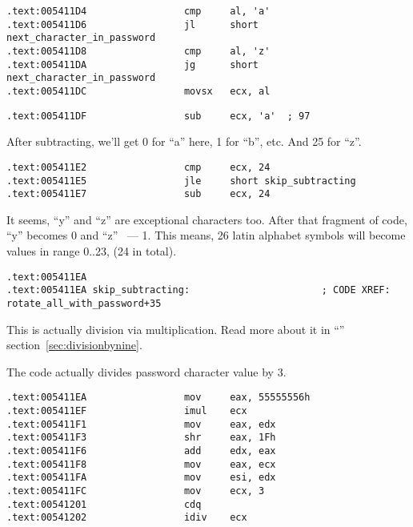 \begin{lstlisting}
.text:005411D4                 cmp     al, 'a'
.text:005411D6                 jl      short next_character_in_password
.text:005411D8                 cmp     al, 'z'
.text:005411DA                 jg      short next_character_in_password
.text:005411DC                 movsx   ecx, al
\end{lstlisting}


\begin{lstlisting}
.text:005411DF                 sub     ecx, 'a'  ; 97
\end{lstlisting}

{After subtracting, we'll get 0 for ``a'' here, 1 for ``b'', etc. And 25 for ``z''.}

\begin{lstlisting}
.text:005411E2                 cmp     ecx, 24
.text:005411E5                 jle     short skip_subtracting
.text:005411E7                 sub     ecx, 24
\end{lstlisting}

{It seems, ``y'' and ``z'' are exceptional characters too. 
After that fragment of code, ``y'' becomes 0 and ``z'' ~--- 1. 
This means, 26 latin alphabet symbols will become values in range 0..23, (24 in total).}

\begin{lstlisting}
.text:005411EA
.text:005411EA skip_subtracting:                       ; CODE XREF: rotate_all_with_password+35
\end{lstlisting}

{This is actually division via multiplication. 
Read more about it in ``\DivisionByNineSectionName'' section~\ref{sec:divisionbynine}.}

{The code actually divides password character value by 3.}

\begin{lstlisting}
.text:005411EA                 mov     eax, 55555556h
.text:005411EF                 imul    ecx
.text:005411F1                 mov     eax, edx
.text:005411F3                 shr     eax, 1Fh
.text:005411F6                 add     edx, eax
.text:005411F8                 mov     eax, ecx
.text:005411FA                 mov     esi, edx
.text:005411FC                 mov     ecx, 3
.text:00541201                 cdq
.text:00541202                 idiv    ecx
\end{lstlisting}

